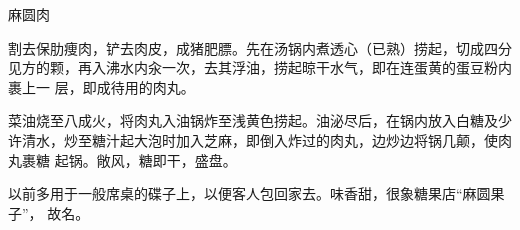\begin{recipe}{麻圆肉}

\ingredients


\preparation

\step 割去保肋痩肉，铲去肉皮，成猪肥膘。先在汤锅内煮透心（已熟）捞起，切成四分
见方的颗，再入沸水内汆一次，去其浮油，捞起晾干水气，即在连蛋黄的蛋豆粉内裹上一
层，即成待用的肉丸。

\step 菜油烧至八成火，将肉丸入油锅炸至浅黄色捞起。油泌尽后，在锅内放入白糖及少
许清水，炒至糖汁起大泡时加入芝麻，即倒入炸过的肉丸，边炒边将锅几颠，使肉丸裹糖
起锅。敞风，糖即干，盛盘。

\features

以前多用于一般席桌的碟子上，以便客人包回家去。味香甜，很象糖果店“麻圆果子”，
故名。

\end{recipe}

